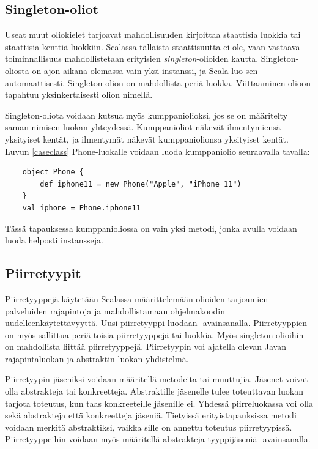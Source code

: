 \subsection{Singleton-oliot} \label{singleton-oliot}
Useat muut oliokielet tarjoavat mahdollisuuden kirjoittaa staattisia luokkia tai staattisia kenttiä luokkiin. Scalassa tällaista staattisuutta ei ole, vaan vastaava toiminnallisuus mahdollistetaan erityisien \textit{singleton}-olioiden kautta. Singleton-oliosta on ajon aikana olemassa vain yksi instanssi, ja Scala luo sen automaattisesti. Singleton-olion on mahdollista periä luokka. Viittaaminen olioon tapahtuu yksinkertaisesti olion nimellä.
\cite[Singleton objects]{tourOfScala}

Singleton-oliota voidaan kutsua myös kumppaniolioksi, jos se on määritelty saman nimisen luokan yhteydessä. Kumppanioliot näkevät ilmentymiensä yksityiset kentät, ja ilmentymät näkevät kumppaniolionsa yksityiset kentät. Luvun \ref{caseclass} Phone-luokalle voidaan luoda kumppaniolio seuraavalla tavalla:
\begin{lstlisting}
    object Phone {
        def iphone11 = new Phone("Apple", "iPhone 11")
    }
    val iphone = Phone.iphone11
\end{lstlisting}
Tässä tapauksessa kumppanioliossa on vain yksi metodi, jonka avulla voidaan luoda helposti instansseja.
\cite[Luku 4]{prorgrammingInScala3rd}


\subsection{Piirretyypit} \label{piirretyypit}
Piirretyyppejä käytetään Scalassa määrittelemään olioiden tarjoamien palveluiden rajapintoja ja mahdollistamaan ohjelmakoodin uudelleenkäytettävyyttä. Uusi piirretyyppi luodaan -avainsanalla. Piirretyyppien on myös sallittua periä toisia piirretyyppejä tai luokkia. Myös singleton-olioihin on mahdollista liittää piirretyyppejä. Piirretyypin voi ajatella olevan Javan rajapintaluokan ja abstraktin luokan yhdistelmä.
\cite[Luku 6 ja 12]{prorgrammingInScala3rd}

Piirretyypin jäseniksi voidaan määritellä metodeita tai muuttujia. Jäsenet voivat olla abstrakteja tai konkreetteja. Abstraktille jäsenelle tulee toteuttavan luokan tarjota toteutus, kun taas konkreeteille jäsenille ei. Yhdessä piirreluokassa voi olla sekä abstrakteja että konkreetteja jäseniä. Tietyissä erityistapauksissa metodi voidaan merkitä abstraktiksi, vaikka sille on annettu toteutus piirretyypissä. Piirretyyppeihin voidaan myös määritellä abstrakteja tyyppijäseniä -avainsanalla.
\cite[Luku 10]{scalaForTheImpatient}
\cite[Luku 20]{prorgrammingInScala3rd}


